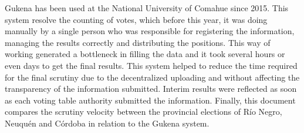 Gukena has been used at the National University of Comahue since 2015. This system resolve the counting of votes, which before this year, it was doing manually by a single person who was responsible for registering the information, managing the results correctly and distributing the positions. This way of working generated a bottleneck in filling the data and it took several hours or even days to get the final results.\newline
This system helped to reduce the time required for the final scrutiny due to the decentralized uploading and without affecting the transparency of the information submitted. Interim results were reflected as soon as each voting table authority submitted the information.\newline
Finally, this document compares the scrutiny velocity between the provincial elections of Río Negro, Neuquén and Córdoba in relation to the Gukena system.

\vfill
\pagebreak
